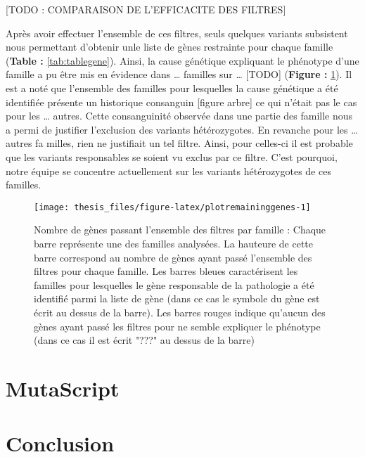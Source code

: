 \documentclass[12pt,twoside]{reedthesis}
\theoremstyle{definition}
\theoremstyle{definition}
\theoremstyle{remark}
\begin{document}
  \newpage
  
  {[}TODO : COMPARAISON DE L'EFFICACITE DES FILTRES{]}
  
  Après avoir effectuer l'ensemble de ces filtres, seuls quelques variants
  subsistent nous permettant d'obtenir unle liste de gènes restrainte pour
  chaque famille (\textbf{Table : }\ref{tab:tablegene}). Ainsi, la cause
  génétique expliquant le phénotype d'une famille a pu être mis en
  évidence dans \ldots{} familles sur \ldots{} {[}TODO{]} (\textbf{Figure
  : }\ref{fig:plotremaininggenes}). Il est a noté que l'ensemble des
  familles pour lesquelles la cause génétique a été identifiée présente un
  historique consanguin {[}figure arbre{]} ce qui n'était pas le cas pour
  les \ldots{} autres. Cette consanguinité observée dans une partie des
  famille nous a permi de justifier l'exclusion des variants
  hétérozygotes. En revanche pour les \ldots{} autres fa milles, rien ne
  justifiait un tel filtre. Ainsi, pour celles-ci il est probable que les
  variants responsables se soient vu exclus par ce filtre. C'est pourquoi,
  notre équipe se concentre actuellement sur les variants hétérozygotes de
  ces familles.
  
  \begin{figure}
  
  {\centering \texttt{[image: thesis\_files/figure-latex/plotremaininggenes-1]} 
  
  }
  
  \caption[Nombre de gènes passant l'ensemble des filtres par famille]{Nombre de gènes passant l'ensemble des filtres par famille  :  Chaque barre représente une des familles analysées. La hauteure de cette barre correspond au nombre de gènes ayant passé l'ensemble des filtres pour chaque famille. Les barres bleues caractérisent les familles pour lesquelles le gène responsable de la pathologie a été identifié parmi la liste de gène (dans ce cas le symbole du gène est écrit au dessus de la barre). Les barres rouges indique qu'aucun des gènes ayant passé les filtres pour ne semble expliquer le phénotype (dans ce cas il est écrit "???" au dessus de la barre)}\label{fig:plotremaininggenes}
  \end{figure}
  
  \chapter{MutaScript}\label{mutascript}
  
  \chapter*{Conclusion}\label{conclusion}
  
\end{document}
